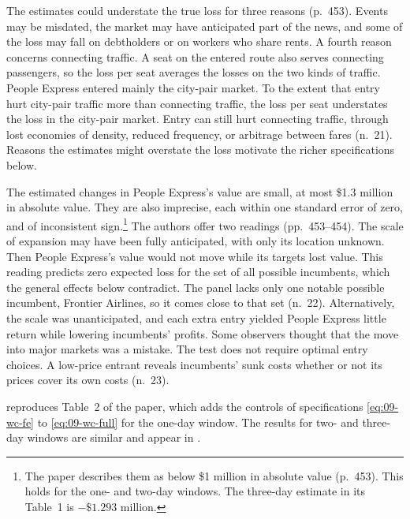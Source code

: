 The estimates could understate the true loss for three reasons (p.~453). Events may be
misdated, the market may have anticipated part of the news, and some of the loss may fall on
debtholders or on workers who share rents. A fourth reason concerns connecting traffic. A seat on the
entered route also serves connecting passengers, so the loss per seat averages the losses on the two
kinds of traffic. People Express entered mainly the city-pair market. To the extent that entry hurt
city-pair traffic more than connecting traffic, the loss per seat understates the loss in the
city-pair market. Entry can still hurt connecting traffic, through lost economies of density, reduced frequency,
or arbitrage between fares (n.~21). Reasons the estimates might overstate the loss motivate the
richer specifications below.

The estimated changes in People Express's value are small, at most \$1.3 million in absolute value.
They are also imprecise, each within one standard error of zero, and of inconsistent
sign.\footnote{The paper describes them as below \$1 million in absolute value (p.~453). This holds for
the one- and two-day windows. The three-day estimate in its Table~1 is $-\$1.293$ million.} The authors
offer two readings (pp.~453--454). The scale of
expansion may have been fully anticipated, with only its location unknown. Then People Express's value
would not move while its targets lost value. This reading predicts zero expected loss for the set of
all possible incumbents, which the general effects below contradict. The panel lacks only one notable
possible incumbent, Frontier Airlines, so it comes close to that set (n.~22). Alternatively, the scale was
unanticipated, and each extra entry yielded People Express little return while lowering incumbents'
profits. Some observers thought that the move into major markets was a mistake. The test does not
require optimal entry choices. A low-price entrant reveals incumbents' sunk costs whether or not its
prices cover its own costs (n.~23).

 reproduces Table~2 of the paper, which adds the controls of specifications
\eqref{eq:09-wc-fe} to \eqref{eq:09-wc-full} for the one-day window. The results for two- and
three-day windows are similar and appear in \citet{WhinstonCollins1990}.

